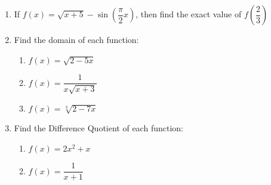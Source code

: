 \documentclass[12pt]{article}
\begin{document}
\begin{enumerate}
\item If $f(x) = \sqrt{x+5}-\sin\left( \dfrac{\pi}{2}x\right)$, then find the exact value of $f\left(\dfrac{2}{3}\right)$

\vfill

\item Find the domain of each function:
\begin{enumerate}
    \item $f(x) = \sqrt{2-5x}$
    \vfill
    \item $f(x) = \dfrac{1}{x\sqrt{x+3}}$
    \vfill
    \item $f(x) = \sqrt[3]{2-7x}$
    \vfill
\end{enumerate}

\pagebreak

\item Find the Difference Quotient of each function:
\begin{enumerate}
    \item $f(x) = 2x^2+x$
    \pagebreak

    \item $f(x) = \dfrac{1}{x+1}$
    \vfill
\end{enumerate}
\end{enumerate}
\end{document}
